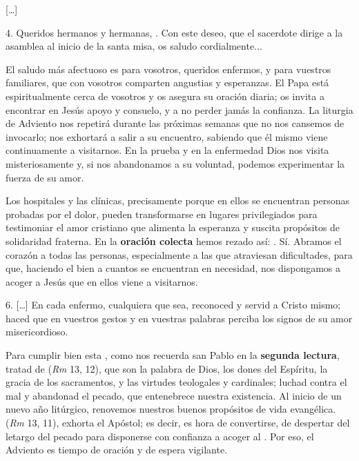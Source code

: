\documentclass[]{article}
\begin{document}
{[}\ldots{}{]}

4. Queridos hermanos y hermanas, . Con este deseo, que el sacerdote dirige a la asamblea al inicio de la santa misa, os saludo cordialmente...

El saludo más afectuoso es para vosotros, queridos enfermos, y para vuestros familiares, que con vosotros comparten angustias y esperanzas. El Papa está espiritualmente cerca de vosotros y os asegura su oración diaria; os invita a encontrar en Jesús apoyo y consuelo, y a no perder jamás la confianza. La liturgia de Adviento nos repetirá durante las próximas semanas que no nos cansemos de invocarlo; nos exhortará a salir a su encuentro, sabiendo que él mismo viene continuamente a visitarnos. En la prueba y en la enfermedad Dios nos visita misteriosamente y, si nos abandonamos a su voluntad, podemos experimentar la fuerza de su amor.

Los hospitales y las clínicas, precisamente porque en ellos se encuentran personas probadas por el dolor, pueden transformarse en lugares privilegiados para testimoniar el amor cristiano que alimenta la esperanza y suscita propósitos de solidaridad fraterna. En la \textbf{oración colecta} hemos rezado así: . Sí. Abramos el corazón a todas las personas, especialmente a las que atraviesan dificultades, para que, haciendo el bien a cuantos se encuentran en necesidad, nos dispongamos a acoger a Jesús que en ellos viene a visitarnos.

6. [\ldots{}] En cada enfermo, cualquiera que sea, reconoced y servid a Cristo mismo; haced que en vuestros gestos y en vuestras palabras perciba los signos de su amor misericordioso.

Para cumplir bien esta , como nos recuerda san Pablo en la \textbf{segunda lectura}, tratad de  (\emph{Rm} 13, 12), que son la palabra de Dios, los dones del Espíritu, la gracia de los sacramentos, y las virtudes teologales y cardinales; luchad contra el mal y abandonad el pecado, que entenebrece nuestra existencia. Al inicio de un nuevo año litúrgico, renovemos nuestros buenos propósitos de vida evangélica.  (\emph{Rm} 13, 11), exhorta el Apóstol; es decir, es hora de convertirse, de despertar del letargo del pecado para disponerse con confianza a acoger al . Por eso, el Adviento es tiempo de oración y de espera vigilante.
\end{document}
